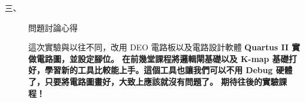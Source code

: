 \documentclass[12pt, a4paper]{article}
\begin{document}
\begin{description}
\begin{description}
\begin{description}
            \end{description}
        \normalsize
      \end{description}
    \item [三、]問題討論心得 \\[.6cm]
      \begin{minipage}[t]{\linewidth}
        \fontsize{16}{18}\selectfont
          這次實驗與以往不同，改用 DEO 電路板以及電路設計軟體 \bf{Quartus II} \normalfont 實做電路圖，並設定腳位。
          在前幾堂課程將邏輯閘基礎以及 K-map 基礎打好，學習新的工具比較能上手。這個工具也讓我們可以不用 Debug 硬體了，只要將電路圖畫好，大致上應該就沒有問題了。
          期待往後的實驗課程！
        \normalsize  
      \end{minipage}
  \normalsize
\end{description}
\end{document}
